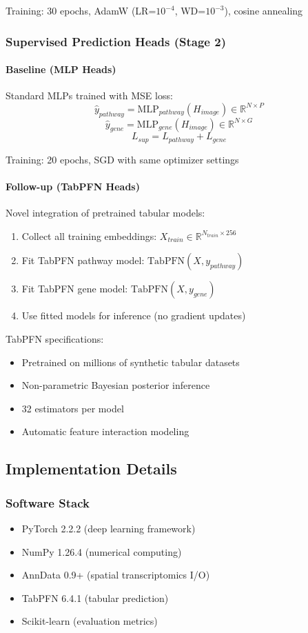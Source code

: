 \documentclass[conference]{IEEEtran}
\begin{document}
Training: 30 epochs, AdamW (LR=$10^{-4}$, WD=$10^{-3}$), cosine annealing

\subsubsection{Supervised Prediction Heads (Stage 2)}

\paragraph{Baseline (MLP Heads)}
Standard MLPs trained with MSE loss:
$$\hat{y}_{pathway} = \text{MLP}_{pathway}(H_{image}) \in \mathbb{R}^{N \times P}$$
$$\hat{y}_{gene} = \text{MLP}_{gene}(H_{image}) \in \mathbb{R}^{N \times G}$$
$$L_{sup} = L_{pathway} + L_{gene}$$

Training: 20 epochs, SGD with same optimizer settings

\paragraph{Follow-up (TabPFN Heads)}
Novel integration of pretrained tabular models:
\begin{enumerate}
\item Collect all training embeddings: $X_{train} \in \mathbb{R}^{N_{train} \times 256}$
\item Fit TabPFN pathway model: $\text{TabPFN}(X, y_{pathway})$
\item Fit TabPFN gene model: $\text{TabPFN}(X, y_{gene})$
\item Use fitted models for inference (no gradient updates)
\end{enumerate}

TabPFN specifications:
\begin{itemize}
\item Pretrained on millions of synthetic tabular datasets
\item Non-parametric Bayesian posterior inference
\item 32 estimators per model
\item Automatic feature interaction modeling
\end{itemize}

\subsection{Implementation Details}

\subsubsection{Software Stack}
\begin{itemize}
\item PyTorch 2.2.2 (deep learning framework)
\item NumPy 1.26.4 (numerical computing)
\item AnnData 0.9+ (spatial transcriptomics I/O)
\item TabPFN 6.4.1 (tabular prediction)
\item Scikit-learn (evaluation metrics)
\end{itemize}
\end{document}
